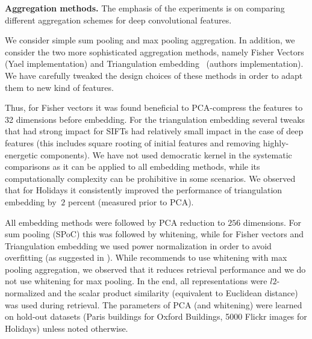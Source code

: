 {\bf Aggregation methods.} The emphasis of the experiments is on comparing different aggregation schemes for deep convolutional features.

We consider simple sum pooling and max pooling aggregation. In addition, we consider the two more sophisticated aggregation methods, namely Fisher Vectors~\cite{Perronnin10} (Yael \cite{Yael} implementation) and Triangulation embedding~\cite{Jegou14} (authors implementation). We have carefully tweaked the design choices of these methods in order to adapt them to new kind of features. 

Thus, for Fisher vectors it was found beneficial to PCA-compress the features to 32 dimensions before embedding. For the triangulation embedding several tweaks that had strong impact for SIFTs had relatively small impact in the case of deep features (this includes square rooting of initial features and removing highly-energetic components). We have not used democratic kernel \cite{Jegou14} in the systematic comparisons as it can be applied to all embedding methods, while its computationally complexity can be prohibitive in some scenarios. We observed that for Holidays it consistently improved the performance of triangulation embedding by $~2$ percent (measured prior to PCA).

All embedding methods were followed by PCA reduction to $256$ dimensions. For sum pooling (SPoC) this was followed by whitening, while for Fisher vectors and Triangulation embedding we used power normalization in order to avoid overfitting (as suggested in \cite{Jegou14}). While \cite{Azizpour14} recommends to use whitening with max pooling aggregation, we observed that it reduces retrieval performance and we do not use whitening for max pooling. In the end, all representations were $l2$-normalized and the scalar product similarity (equivalent to Euclidean distance) was used during retrieval. The parameters of PCA (and whitening) were learned on hold-out datasets (Paris buildings for Oxford Buildings, 5000 Flickr images for Holidays) unless noted otherwise.

